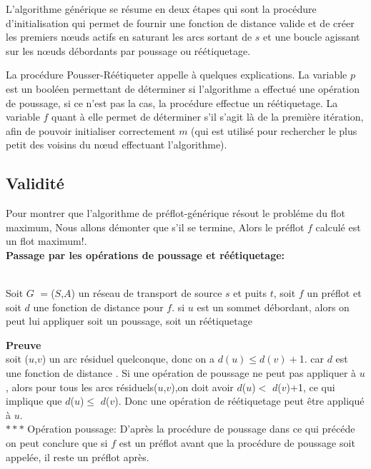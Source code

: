 L'algorithme générique se résume en deux étapes qui sont la procédure d'initialisation qui permet de
fournir une fonction de distance valide et de créer les premiers n\oe uds actifs en saturant les
arcs sortant de $s$ et une boucle agissant sur les n\oe uds débordants par poussage ou réétiquetage.




La procédure Pousser-Réétiqueter appelle à quelques explications. La variable $p$ est un booléen
permettant de déterminer si l'algorithme a effectué une opération de poussage, si ce n'est pas la
cas, la procédure effectue un réétiquetage. La variable $f$ quant à elle permet de déterminer s'il
s'agit là de la première itération, afin de pouvoir initialiser correctement $m$ (qui est utilisé
pour rechercher le plus petit des voisins du n\oe ud effectuant l'algorithme).



\subsection{Validité}

Pour montrer que l'algorithme de préflot-générique résout le probléme du flot maximum, Nous allons démonter que s'il se termine, Alors le préflot $f$ calculé est un flot maximum!.\\

\textbf{Passage par les opérations de poussage et réétiquetage:}  
\begin{lemma} ~\\
	\label{increase_distance}Soit $G$ $=$($S$,$A$) un réseau de transport de source $s$ et puits $t$, soit $f$ un préflot et 
  soit $d$ une fonction  de distance  pour $f$. si $u$ est un sommet débordant, alors on peut lui appliquer soit un poussage, soit un réétiquetage  
\end{lemma}   
\textbf{Preuve} \\
soit ($u$,$v$) un arc résiduel quelconque, donc on a $d(u)\leq d(v)+$1. car $d$ est une fonction  de distance .  Si une opération de poussage ne peut pas appliquer à $u$, alors pour tous les arcs résiduels($u$,$v$),on doit avoir $d$($u$)$<$ $d$($v$)$+$1, ce qui implique que $d$($u$)$\leq$ $d$($v$). Donc une opération de réétiquetage peut être appliqué à $u$.\\                        

$***$ Opération poussage:
D'après la procédure de poussage dans ce qui précéde on peut conclure que
si $f$ est un préflot avant que la procédure de poussage soit appelée, il reste un préflot après.\\

